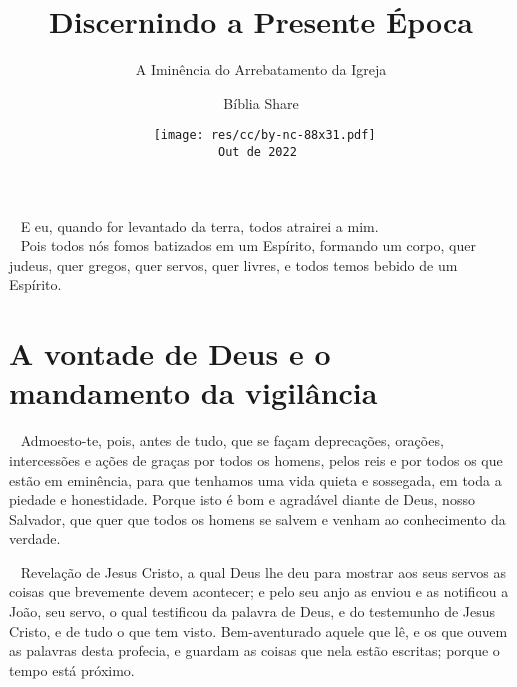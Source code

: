 \documentclass[12pt,aspectratio=169]{beamer}
\title{Discernindo a Presente Época}
\subtitle{A Iminência do Arrebatamento da Igreja}
\author{Bíblia Share}
\date[{\tiny\tt{Out de 2022}}]{{\scriptsize\tt%
    \texttt{[image: res/cc/by-nc-88x31.pdf]}\\[\smallskipamount]
    Out de 2022%
}}
\newcommand{\ver}[1]{%
    \raisebox{0.50ex}{%
        \scalebox{1.1}{%
            \pmb{\textbf{\textcolor{BSpbg}{#1}}}%
        }%
    }%
}
\newcommand{\QUOTE}[1]{%
    \par\noindent\hspace*{0.1\linewidth}%
    \begin{minipage}{0.8\linewidth}%
        \linespread{1.35}\large{#1}%
    \end{minipage}%
}
\newcommand{\WIDEQUOTE}[1]{%
    \par\noindent\hspace*{0.02\linewidth}%
    \begin{minipage}{0.92\linewidth}%
        \linespread{1.25}\large{#1}%
    \end{minipage}%
}
\newcommand{\RED}[1]{{\textcolor{TXred}{#1}}}
\newcommand{\ORA}[1]{{\textcolor{TXora}{#1}}}
\newcommand{\YEL}[1]{{\textcolor{TXyel}{#1}}}
\newcommand{\GRE}[1]{{\textcolor{TXgre}{#1}}}
\newcommand{\CYA}[1]{{\textcolor{TXcya}{#1}}}
\newcommand{\MAG}[1]{{\textcolor{TXmag}{#1}}}
\begin{document}
\begin{frame}
    \titlepage
\end{frame}

    \begin{frame}
        \QUOTE{%
            \ver{(ARC) Jo~12.32}~%
            E eu, quando for \RED{levantado da terra}, \MAG{todos} \YEL{atrairei a mim}.
            \\[\bigskipamount]
            \ver{(ARC) 1Co~12.13}~%
            Pois \MAG{todos nós} fomos \YEL{batizados}  em  um  Espírito,  \YEL{formando  um
            corpo}, quer judeus, quer gregos, quer servos, quer livres, e todos temos bebido
            de um Espírito.
        }
    \end{frame}

\section{A vontade de Deus e o mandamento da vigilância}

    \begin{frame}
        \QUOTE{%
            \ver{(ARC) 1Tm~2.1--4}~%
            Admoesto-te,  pois,  antes  de  tudo,  que  se   façam   deprecações,   orações,
            intercessões e ações de graças \ORA{por todos os homens}, pelos reis e por todos
            os que estão em eminência, para que tenhamos uma vida  quieta  e  sossegada,  em
            toda a piedade e honestidade. Porque isto é bom  e  agradável  diante  de  Deus,
            nosso Salvador, que \MAG{quer} que \YEL{todos os homens se salvem} e  venham  ao
            \GRE{conhecimento da verdade}.
        }
    \end{frame}

    \begin{frame}
        \WIDEQUOTE{%
            \ver{(ARC) Ap~1.1--3}~%
            Revelação de Jesus Cristo, a qual Deus lhe deu \YEL{para mostrar} \ORA{aos  seus
            servos} as coisas que brevemente \GRE{devem  acontecer};  e  pelo  seu  anjo  as
            enviou e as notificou a João, seu servo, o qual testificou da palavra de Deus, e
            do testemunho de Jesus Cristo, e de tudo o que tem  visto.  \YEL{Bem-aventurado}
            aquele que \CYA{lê}, e \CYA{os que ouvem} as palavras  desta  \MAG{profecia},  e
            \CYA{guardam} as coisas que nela estão escritas; porque o tempo está próximo.
        }
    \end{frame}
\end{document}
